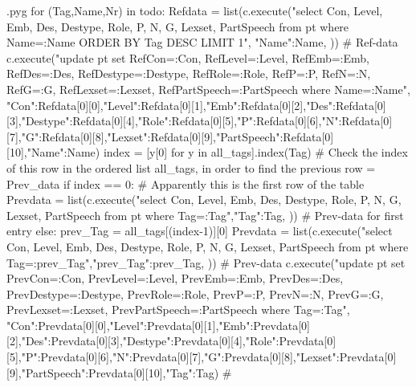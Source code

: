 \documentclass{report}
\makeatletter
\newenvironment{python}{%
  \VerbatimEnvironment
  \minted@resetoptions
  \setkeys{minted@opt}{}
      \begin{VerbatimOut}{\jobname.pyg}}
{%
      \end{VerbatimOut}
      \minted@pygmentize{python}
      \DeleteFile{\jobname.pyg}}
\makeatother
\begin{document}
\begin{python}
{{{for (Tag,Name,Nr) in todo:
    Refdata = list(c.execute("select Con, Level, Emb, Des, Destype, Role, P, N, G, Lexset, PartSpeech from pt where Name=:Name ORDER BY Tag DESC LIMIT 1", {"Name":Name, })) # Ref-data
    c.execute("update pt set RefCon=:Con, RefLevel=:Level, RefEmb=:Emb, RefDes=:Des, RefDestype=:Destype, RefRole=:Role, RefP=:P, RefN=:N, RefG=:G, RefLexset=:Lexset, RefPartSpeech=:PartSpeech where Name=:Name", {"Con":Refdata[0][0],"Level":Refdata[0][1],"Emb":Refdata[0][2],"Des":Refdata[0][3],"Destype":Refdata[0][4],"Role":Refdata[0][5],"P":Refdata[0][6],"N":Refdata[0][7],"G":Refdata[0][8],"Lexset":Refdata[0][9],"PartSpeech":Refdata[0][10],"Name":Name})
    index = [y[0] for y in all_tags].index(Tag)  # Check the index of this row in the ordered list all_tags, in order to find the previous row = Prev_data 
    if index == 0:  # Apparently this is the first row of the table
        Prevdata = list(c.execute("select Con, Level, Emb, Des, Destype, Role, P, N, G, Lexset, PartSpeech from pt where Tag=:Tag",{"Tag":Tag, })) # Prev-data for first entry
    else:
        prev_Tag = all_tags[(index-1)][0]
        Prevdata = list(c.execute("select Con, Level, Emb, Des, Destype, Role, P, N, G, Lexset, PartSpeech from pt where Tag=:prev_Tag",{"prev_Tag":prev_Tag, })) # Prev-data
    c.execute("update pt set PrevCon=:Con, PrevLevel=:Level, PrevEmb=:Emb, PrevDes=:Des, PrevDestype=:Destype, PrevRole=:Role, PrevP=:P, PrevN=:N, PrevG=:G, PrevLexset=:Lexset, PrevPartSpeech=:PartSpeech where Tag=:Tag", {"Con":Prevdata[0][0],"Level":Prevdata[0][1],"Emb":Prevdata[0][2],"Des":Prevdata[0][3],"Destype":Prevdata[0][4],"Role":Prevdata[0][5],"P":Prevdata[0][6],"N":Prevdata[0][7],"G":Prevdata[0][8],"Lexset":Prevdata[0][9],"PartSpeech":Prevdata[0][10],"Tag":Tag})
#}}}
\end{python}
\end{document}
